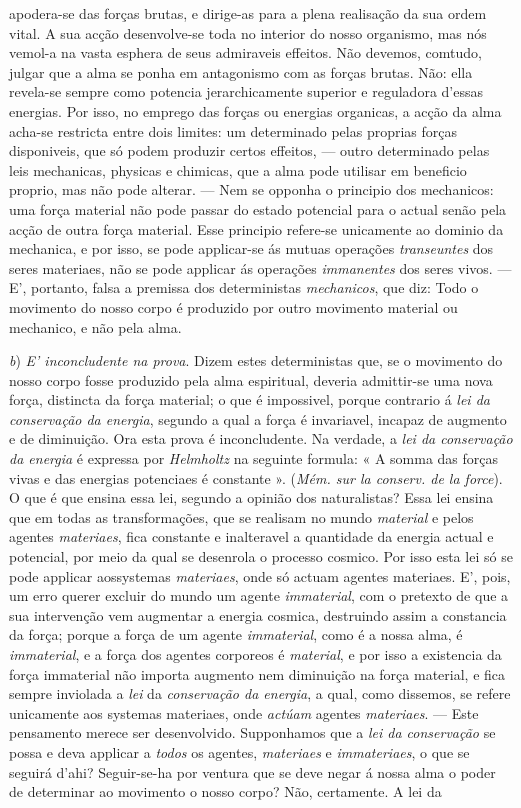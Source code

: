 apodera-se das forças brutas, e dirige-as para a plena realisação da sua ordem vital. A sua acção desenvolve-se toda no interior do nosso organismo, mas nós vemol-a na vasta esphera de seus admiraveis effeitos. Não devemos, comtudo, julgar que a alma se ponha em antagonismo com as forças brutas. Não: ella revela-se sempre como potencia jerarchicamente superior e reguladora d'essas energias. Por isso, no emprego das forças ou energias organicas, a acção da alma acha-se restricta entre dois limites: um determinado pelas proprias forças disponiveis, que só podem produzir certos effeitos, --- outro determinado pelas leis mechanicas, physicas e chimicas, que a alma pode utilisar em beneficio proprio, mas não pode alterar. --- Nem se opponha o principio dos mechanicos: uma força material não pode passar do estado potencial para o actual senão pela acção de outra força material. Esse principio refere-se unicamente ao dominio da mechanica, e por isso, se pode applicar-se ás mutuas operações \emph{transeuntes} dos seres materiaes, não se pode applicar ás operações \emph{immanentes} dos seres vivos. --- E', portanto, falsa a premissa dos deterministas \emph{mechanicos}, que diz: Todo o movimento do nosso corpo é produzido por outro movimento material ou mechanico, e não pela alma.\par \emph{b}) \emph{E' inconcludente na prova}. Dizem estes deterministas que, se o movimento do nosso corpo fosse produzido pela alma espiritual, deveria admittir-se uma nova força, distincta da força material; o que é impossivel, porque contrario á \emph{lei da conservação da energia}, segundo a qual a força é invariavel, incapaz de augmento e de diminuição. Ora esta prova é inconcludente. Na verdade, a \emph{lei da conservação da energia} é expressa por \emph{Helmholtz} na seguinte formula: « A somma das forças vivas e das energias potenciaes é constante ». (\emph{Mém. sur la conserv. de la force}). O que é que ensina essa lei, segundo a opinião dos naturalistas? Essa lei ensina que em todas as transformações, que se realisam no mundo \emph{material} e pelos agentes \emph{materiaes}, fica constante e inalteravel a quantidade da energia actual e potencial, por meio da qual se desenrola o processo cosmico. Por isso esta lei só se pode applicar aossystemas \emph{materiaes}, onde só actuam agentes materiaes. E', pois, um erro querer excluir do mundo um agente \emph{immaterial}, com o pretexto de que a sua intervenção vem augmentar a energia cosmica, destruindo assim a constancia da força; porque a força de um agente \emph{immaterial}, como é a nossa alma, é \emph{immaterial}, e a força dos agentes corporeos é \emph{material}, e por isso a existencia da força immaterial não importa augmento nem diminuição na força material, e fica sempre inviolada a \emph{lei} da \emph{conservação da energia}, a qual, como dissemos, se refere unicamente aos systemas materiaes, onde \emph{actúam} agentes \emph{materiaes}. --- Este pensamento merece ser desenvolvido. Supponhamos que a \emph{lei da conservação} se possa e deva applicar a \emph{todos} os agentes, \emph{materiaes} e \emph{immateriaes}, o que se seguirá d'ahi? Seguir-se-ha por ventura que se deve negar á nossa alma o poder de determinar ao movimento o nosso corpo? Não, certamente. A lei da 